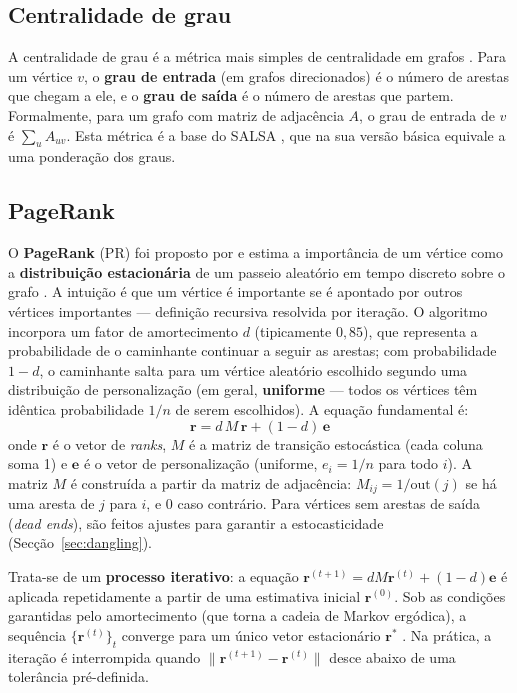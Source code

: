 \subsection{Centralidade de grau}
\label{sec:grau}

A centralidade de grau é a métrica mais simples de centralidade em
grafos \parencite{newman2010}. Para um vértice $v$, o
\textbf{grau de entrada} (em grafos direcionados) é o número de
arestas que chegam a ele, e o \textbf{grau de saída} é o número de
arestas que partem. Formalmente, para um grafo com matriz de
adjacência $A$, o grau de entrada de $v$ é $\sum_{u} A_{uv}$. Esta
métrica é a base do SALSA \parencite{lempel2001}, que na sua versão
básica equivale a uma ponderação dos graus.

\subsection{PageRank}
\label{sec:pagerank}

O \textbf{PageRank} (PR) foi proposto por \citet{page1999} e estima a
importância de um vértice como a \textbf{distribuição estacionária}
de um passeio aleatório em tempo discreto sobre o grafo
\parencite{brin1998, masuda2017}. A intuição é que um vértice é
importante se é apontado por outros vértices importantes ---
definição recursiva resolvida por iteração. O algoritmo incorpora um
fator de amortecimento $d$ (tipicamente $0{,}85$), que representa a
probabilidade de o caminhante continuar a seguir as arestas; com
probabilidade $1 - d$, o caminhante salta para um vértice aleatório
escolhido segundo uma distribuição de personalização (em geral,
\textbf{uniforme} --- todos os vértices têm idêntica probabilidade
$1/n$ de serem escolhidos). A equação fundamental é:
\begin{equation}
    \mathbf{r} = d\, M\, \mathbf{r} + (1 - d)\, \mathbf{e}
    \label{eq:pagerank}
\end{equation}
onde $\mathbf{r}$ é o vetor de \emph{ranks}, $M$ é a matriz de
transição estocástica (cada coluna soma 1) e $\mathbf{e}$ é o vetor
de personalização (uniforme, $e_i = 1/n$ para todo $i$). A matriz $M$
é construída a partir da matriz de adjacência: $M_{ij} = 1/\text{out}(j)$
se há uma aresta de $j$ para $i$, e $0$ caso contrário. Para vértices
sem arestas de saída (\emph{dead ends}), são feitos ajustes para
garantir a estocasticidade (Secção~\ref{sec:dangling}).

Trata-se de um \textbf{processo iterativo}: a equação
$\mathbf{r}^{(t+1)} = d M \mathbf{r}^{(t)} + (1-d)\mathbf{e}$ é
aplicada repetidamente a partir de uma estimativa inicial
$\mathbf{r}^{(0)}$. Sob as condições garantidas pelo amortecimento
(que torna a cadeia de Markov ergódica), a sequência
$\{\mathbf{r}^{(t)}\}_t$ converge para um único vetor estacionário
$\mathbf{r}^{*}$ \parencite{brin1998, masuda2017}. Na prática, a
iteração é interrompida quando
$\|\mathbf{r}^{(t+1)} - \mathbf{r}^{(t)}\|$ desce abaixo de uma
tolerância pré-definida.

